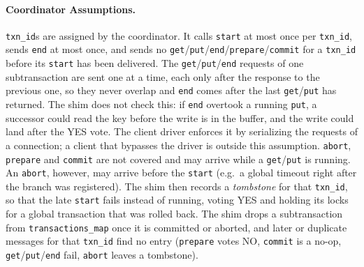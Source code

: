 \documentclass{article}
\begin{document}
\paragraph{Coordinator Assumptions.}
\texttt{txn\_id}s are assigned by the coordinator. It calls \texttt{start} at most once per \texttt{txn\_id}, sends \texttt{end} at most once, and sends no \texttt{get}/\texttt{put}/\texttt{end}/\texttt{prepare}/\texttt{commit} for a \texttt{txn\_id} before its \texttt{start} has been delivered. The \texttt{get}/\texttt{put}/\texttt{end} requests of one subtransaction are sent one at a time, each only after the response to the previous one, so they never overlap and \texttt{end} comes after the last \texttt{get}/\texttt{put} has returned. The shim does not check this: if \texttt{end} overtook a running \texttt{put}, a successor could read the key before the write is in the buffer, and the write could land after the YES vote. The client driver enforces it by serializing the requests of a connection; a client that bypasses the driver is outside this assumption. \texttt{abort}, \texttt{prepare} and \texttt{commit} are not covered and may arrive while a \texttt{get}/\texttt{put} is running. An \texttt{abort}, however, may arrive before the \texttt{start} (e.g.\ a global timeout right after the branch was registered). The shim then records a \emph{tombstone} for that \texttt{txn\_id}, so that the late \texttt{start} fails instead of running, voting YES and holding its locks for a global transaction that was rolled back. The shim drops a subtransaction from \texttt{transactions\_map} once it is committed or aborted, and later or duplicate messages for that \texttt{txn\_id} find no entry (\texttt{prepare} votes NO, \texttt{commit} is a no-op, \texttt{get}/\texttt{put}/\texttt{end} fail, \texttt{abort} leaves a tombstone).
\end{document}
